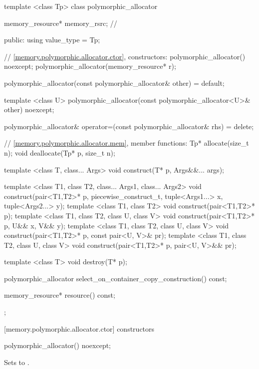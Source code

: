 %
\begin{codeblock}
template <class Tp>
class polymorphic_allocator {
  memory_resource* memory_rsrc; // \expos

public:
  using value_type = Tp;

  // \ref{memory.polymorphic.allocator.ctor}, constructors:
  polymorphic_allocator() noexcept;
  polymorphic_allocator(memory_resource* r);

  polymorphic_allocator(const polymorphic_allocator& other) = default;

  template <class U>
    polymorphic_allocator(const polymorphic_allocator<U>& other) noexcept;

  polymorphic_allocator&
    operator=(const polymorphic_allocator& rhs) = delete;

  // \ref{memory.polymorphic.allocator.mem}, member functions:
  Tp* allocate(size_t n);
  void deallocate(Tp* p, size_t n);

  template <class T, class... Args>
  void construct(T* p, Args&&... args);

  template <class T1, class T2, class... Args1, class... Args2>
    void construct(pair<T1,T2>* p, piecewise_construct_t,
                   tuple<Args1...> x, tuple<Args2...> y);
  template <class T1, class T2>
    void construct(pair<T1,T2>* p);
  template <class T1, class T2, class U, class V>
    void construct(pair<T1,T2>* p, U&& x, V&& y);
  template <class T1, class T2, class U, class V>
    void construct(pair<T1,T2>* p, const pair<U, V>& pr);
  template <class T1, class T2, class U, class V>
    void construct(pair<T1,T2>* p, pair<U, V>&& pr);

  template <class T>
    void destroy(T* p);

  polymorphic_allocator select_on_container_copy_construction() const;

  memory_resource* resource() const;
};
\end{codeblock}


[memory.polymorphic.allocator.ctor]{ constructors}

%
\begin{itemdecl}
polymorphic_allocator() noexcept;
\end{itemdecl}

\begin{itemdescr}
\pnum
\effects
Sets  to .
\end{itemdescr}

